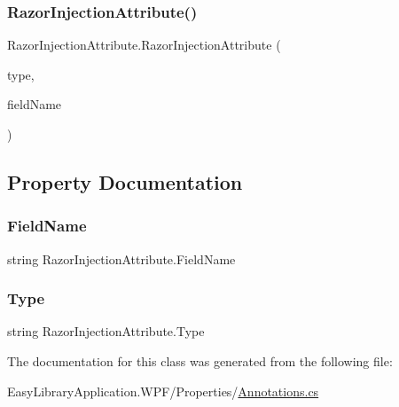 \subsubsection{\texorpdfstring{Razor\+Injection\+Attribute()}{RazorInjectionAttribute()}}
{\footnotesize\ttfamily Razor\+Injection\+Attribute.\+Razor\+Injection\+Attribute (\begin{DoxyParamCaption}\item[{\mbox{[}\+Not\+Null\mbox{]} string}]{type,  }\item[{\mbox{[}\+Not\+Null\mbox{]} string}]{field\+Name }\end{DoxyParamCaption})}



\subsection{Property Documentation}
\mbox{\label{class_razor_injection_attribute_ace7a81f227c76db0a47cca6edb85a911}} 
\subsubsection{\texorpdfstring{Field\+Name}{FieldName}}
{\footnotesize\ttfamily string Razor\+Injection\+Attribute.\+Field\+Name\hspace{0.3cm}{\ttfamily [get]}}

\mbox{\label{class_razor_injection_attribute_a03ab3ec12db49f3eeca9d462b95bb6fd}} 
\subsubsection{\texorpdfstring{Type}{Type}}
{\footnotesize\ttfamily string Razor\+Injection\+Attribute.\+Type\hspace{0.3cm}{\ttfamily [get]}}



The documentation for this class was generated from the following file\+:\begin{DoxyCompactItemize}
\item 
Easy\+Library\+Application.\+W\+P\+F/\+Properties/\mbox{\hyperlink{_annotations_8cs}{Annotations.\+cs}}\end{DoxyCompactItemize}
